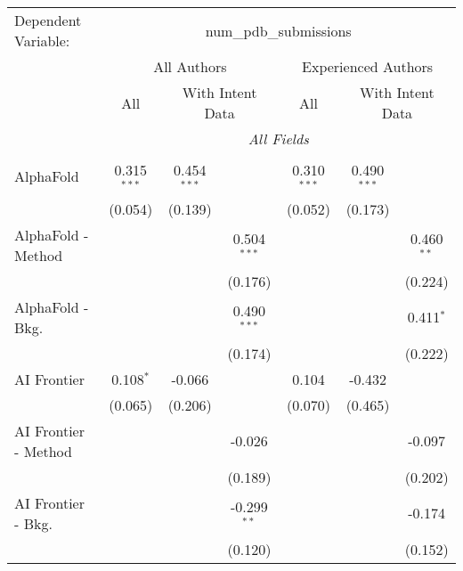 \begingroup
\centering
\begin{tabular}{lcccccc}
   \tabularnewline \midrule \midrule
   Dependent Variable: & \multicolumn{6}{c}{num\_pdb\_submissions}\\
 & \multicolumn{3}{c}{All Authors} & \multicolumn{3}{c}{Experienced Authors} \\
\cmidrule(lr){2-4} \cmidrule(lr){5-7}
 & \multicolumn{1}{c}{All} & \multicolumn{2}{c}{With Intent Data} & \multicolumn{1}{c}{All} & \multicolumn{2}{c}{With Intent Data} \\
\cmidrule(lr){2-2} \cmidrule(lr){3-4} \cmidrule(lr){5-5} \cmidrule(lr){6-7}
 & \multicolumn{6}{c}{\textit{All Fields}} \\ \\
   AlphaFold            & 0.315$^{***}$ & 0.454$^{***}$ &                & 0.310$^{***}$ & 0.490$^{***}$ &   \\   
                        & (0.054)       & (0.139)       &                & (0.052)       & (0.173)       &   \\   
   AlphaFold - Method   &               &               & 0.504$^{***}$  &               &               & 0.460$^{**}$\\   
                        &               &               & (0.176)        &               &               & (0.224)\\   
   AlphaFold - Bkg.     &               &               & 0.490$^{***}$  &               &               & 0.411$^{*}$\\   
                        &               &               & (0.174)        &               &               & (0.222)\\   
   AI Frontier          & 0.108$^{*}$   & -0.066        &                & 0.104         & -0.432        &   \\   
                        & (0.065)       & (0.206)       &                & (0.070)       & (0.465)       &   \\   
   AI Frontier - Method &               &               & -0.026         &               &               & -0.097\\   
                        &               &               & (0.189)        &               &               & (0.202)\\   
   AI Frontier - Bkg.   &               &               & -0.299$^{**}$  &               &               & -0.174\\   
                        &               &               & (0.120)        &               &               & (0.152)\\   

\end{tabular}
